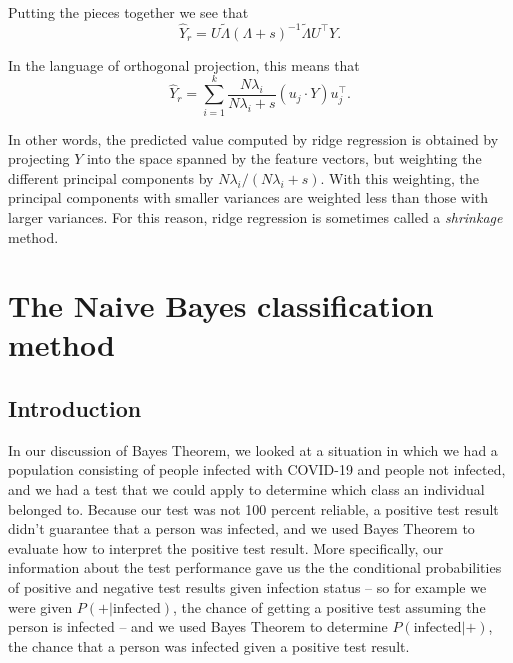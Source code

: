 \documentclass[
  11pt,
  letterpaper,
]{scrbook}
\theoremstyle{plain}
\theoremstyle{plain}
\theoremstyle{remark}
\begin{document}
Putting the pieces together we see that \[
\hat{Y}_{r}=U\tilde{\Lambda}(\Lambda+s)^{-1}\tilde{\Lambda}U^{\intercal}Y.
\]

In the language of orthogonal projection, this means that \[
\hat{Y}_{r} = \sum_{i=1}^{k} \frac{N\lambda_{i}}{N\lambda_{i}+s}(u_j\cdot Y)u_{j}^{\intercal}.
\]

In other words, the predicted value computed by ridge regression is
obtained by projecting \(Y\) into the space spanned by the feature
vectors, but weighting the different principal components by
\(N\lambda_{i}/(N\lambda_{i}+s)\). With this weighting, the principal
components with smaller variances are weighted less than those with
larger variances. For this reason, ridge regression is sometimes called
a \emph{shrinkage} method.


\hypertarget{the-naive-bayes-classification-method}{%
\chapter{The Naive Bayes classification
method}\label{the-naive-bayes-classification-method}}


\hypertarget{introduction-2}{%
\section{Introduction}\label{introduction-2}}

In our discussion of Bayes Theorem, we looked at a situation in which we
had a population consisting of people infected with COVID-19 and people
not infected, and we had a test that we could apply to determine which
class an individual belonged to. Because our test was not 100 percent
reliable, a positive test result didn't guarantee that a person was
infected, and we used Bayes Theorem to evaluate how to interpret the
positive test result. More specifically, our information about the test
performance gave us the the conditional probabilities of positive and
negative test results given infection status -- so for example we were
given \(P(+|\mathrm{infected})\), the chance of getting a positive test
assuming the person is infected -- and we used Bayes Theorem to
determine \(P(\mathrm{infected}|+)\), the chance that a person was
infected given a positive test result.
\end{document}
